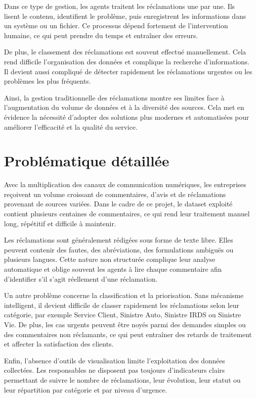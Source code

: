 \documentclass[12pt,a4paper,oneside]{report}
\begin{document}
Dans ce type de gestion, les agents traitent les réclamations une par une. Ils lisent le contenu, identifient le problème, puis enregistrent les informations dans un système ou un fichier. Ce processus dépend fortement de l’intervention humaine, ce qui peut prendre du temps et entraîner des erreurs.

De plus, le classement des réclamations est souvent effectué manuellement. Cela rend difficile l’organisation des données et complique la recherche d’informations. Il devient aussi compliqué de détecter rapidement les réclamations urgentes ou les problèmes les plus fréquents.



Ainsi, la gestion traditionnelle des réclamations montre ses limites face à l’augmentation du volume de données et à la diversité des sources. Cela met en évidence la nécessité d’adopter des solutions plus modernes et automatisées pour améliorer l’efficacité et la qualité du service.

\section{Problématique détaillée}

Avec la multiplication des canaux de communication numériques, les entreprises reçoivent un volume croissant de commentaires, d’avis et de réclamations provenant de sources variées. Dans le cadre de ce projet, le dataset exploité contient plusieurs centaines de commentaires, ce qui rend leur traitement manuel long, répétitif et difficile à maintenir.

Les réclamations sont généralement rédigées sous forme de texte libre. Elles peuvent contenir des fautes, des abréviations, des formulations ambiguës ou plusieurs langues. Cette nature non structurée complique leur analyse automatique et oblige souvent les agents à lire chaque commentaire afin d’identifier s’il s’agit réellement d’une réclamation.

Un autre problème concerne la classification et la priorisation. Sans mécanisme intelligent, il devient difficile de classer rapidement les réclamations selon leur catégorie, par exemple Service Client, Sinistre Auto, Sinistre IRDS ou Sinistre Vie. De plus, les cas urgents peuvent être noyés parmi des demandes simples ou des commentaires non réclamants, ce qui peut entraîner des retards de traitement et affecter la satisfaction des clients.

Enfin, l’absence d’outils de visualisation limite l’exploitation des données collectées. Les responsables ne disposent pas toujours d’indicateurs clairs permettant de suivre le nombre de réclamations, leur évolution, leur statut ou leur répartition par catégorie et par niveau d’urgence.
\end{document}

